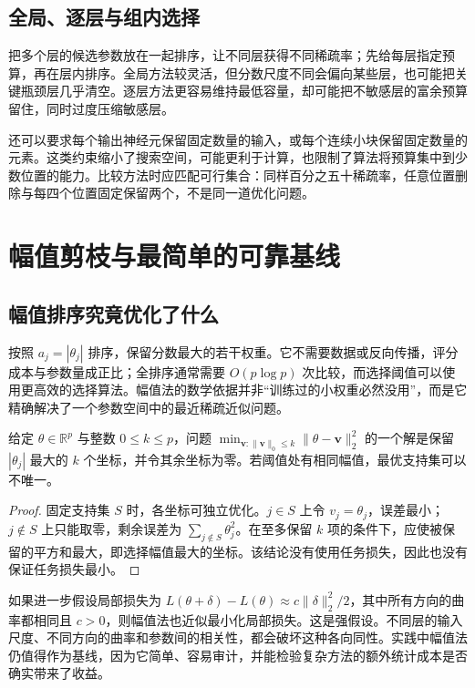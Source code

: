 \documentclass[UTF8,12pt,a4paper,fontset=fandol]{ctexart}
\begin{document}
\subsection{全局、逐层与组内选择}
把多个层的候选参数放在一起排序，让不同层获得不同稀疏率；先给每层指定预算，再在层内排序。全局方法较灵活，但分数尺度不同会偏向某些层，也可能把关键瓶颈层几乎清空。逐层方法更容易维持最低容量，却可能把不敏感层的富余预算留住，同时过度压缩敏感层。

还可以要求每个输出神经元保留固定数量的输入，或每个连续小块保留固定数量的元素。这类约束缩小了搜索空间，可能更利于计算，也限制了算法将预算集中到少数位置的能力。比较方法时应匹配可行集合：同样百分之五十稀疏率，任意位置删除与每四个位置固定保留两个，不是同一道优化问题。

\section{幅值剪枝与最简单的可靠基线}
\label{sec:prune-magnitude}

\subsection{幅值排序究竟优化了什么}
按照 $a_j=|\theta_j|$ 排序，保留分数最大的若干权重。它不需要数据或反向传播，评分成本与参数量成正比；全排序通常需要 $O(p\log p)$ 次比较，而选择阈值可以使用更高效的选择算法。幅值法的数学依据并非“训练过的小权重必然没用”，而是它精确解决了一个参数空间中的最近稀疏近似问题。

\begin{proposition}[欧氏距离下的最佳稀疏近似]
\label{prop:prune-hard-threshold}
给定 $\theta\in\mathbb R^p$ 与整数 $0\leq k\leq p$，问题 $\min_{\mathbf v:\|\mathbf v\|_0\leq k}\|\theta-\mathbf v\|_2^2$ 的一个解是保留 $|\theta_j|$ 最大的 $k$ 个坐标，并令其余坐标为零。若阈值处有相同幅值，最优支持集可以不唯一。
\end{proposition}
\begin{proof}
固定支持集 $S$ 时，各坐标可独立优化。$j\in S$ 上令 $v_j=\theta_j$，误差最小；$j\notin S$ 上只能取零，剩余误差为 $\sum_{j\notin S}\theta_j^2$。在至多保留 $k$ 项的条件下，应使被保留的平方和最大，即选择幅值最大的坐标。该结论没有使用任务损失，因此也没有保证任务损失最小。
\end{proof}

如果进一步假设局部损失为 $L(\theta+\delta)-L(\theta)\approx c\|\delta\|_2^2/2$，其中所有方向的曲率都相同且 $c>0$，则幅值法也近似最小化局部损失。这是强假设。不同层的输入尺度、不同方向的曲率和参数间的相关性，都会破坏这种各向同性。实践中幅值法仍值得作为基线，因为它简单、容易审计，并能检验复杂方法的额外统计成本是否确实带来了收益。
\end{document}
